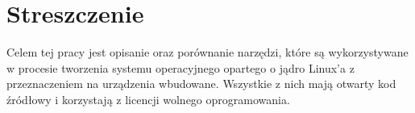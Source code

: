 \documentclass[printmode]{mgr}
\begin{document}




%
%
%
%




















\listoffigures

\listoftables

\chapter*{Streszczenie}
Celem tej pracy jest opisanie oraz porównanie narzędzi, które są wykorzystywane w procesie tworzenia systemu operacyjnego opartego o jądro Linux'a z przeznaczeniem na urządzenia wbudowane.
Wszystkie z nich mają otwarty kod źródłowy i korzystają z licencji wolnego oprogramowania.
\end{document}
